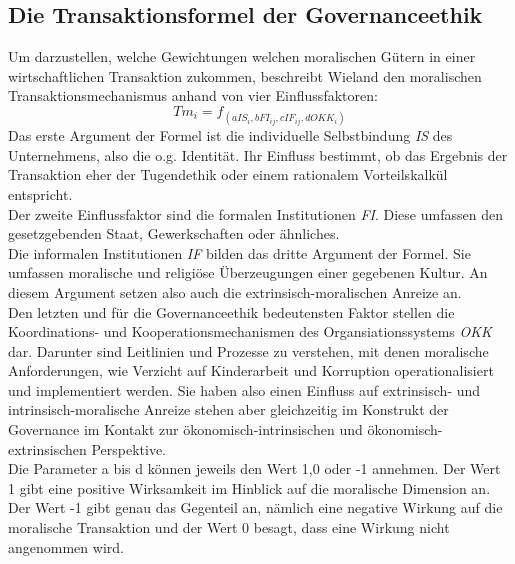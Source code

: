 \documentclass[12pt]{article}
\begin{document}
\subsection{Die Transaktionsformel der Governanceethik}
Um darzustellen, welche Gewichtungen welchen moralischen Gütern in einer wirtschaftlichen Transaktion zukommen, beschreibt Wieland den moralischen Transaktionsmechanismus anhand von vier Einflussfaktoren:
\[Tm_{i}=f_{(aIS_i, bFI_{ij}, cIF_{ij}, dOKK_i)}\]
Das erste Argument der Formel ist die individuelle Selbstbindung \textit{IS} des Unternehmens, also die o.g. Identität. Ihr Einfluss bestimmt, ob das Ergebnis der Transaktion eher der Tugendethik oder einem rationalem Vorteilskalkül entspricht.\\
Der zweite Einflussfaktor sind die formalen Institutionen \textit{FI}. Diese umfassen den gesetzgebenden Staat, Gewerkschaften oder ähnliches.\\
Die informalen Institutionen \textit{IF} bilden das dritte Argument der Formel. Sie umfassen moralische und religiöse Überzeugungen einer gegebenen Kultur. An diesem Argument setzen also auch die extrinsisch-moralischen Anreize an.\\
Den letzten und für die Governanceethik bedeutensten Faktor stellen die Koordinations- und Kooperationsmechanismen des Organsiationssystems \textit{OKK} dar. Darunter sind Leitlinien und Prozesse zu verstehen, mit denen moralische Anforderungen, wie Verzicht auf Kinderarbeit und Korruption operationalisiert und implementiert werden. Sie haben also einen Einfluss auf extrinsisch- und intrinsisch-moralische Anreize stehen aber gleichzeitig im Konstrukt der Governance im Kontakt zur ökonomisch-intrinsischen und ökonomisch-extrinsischen Perspektive.\\
Die Parameter a bis d können jeweils den Wert 1,0 oder -1 annehmen. Der Wert 1 gibt eine positive Wirksamkeit im Hinblick auf die moralische Dimension an. Der Wert -1 gibt genau das Gegenteil an, nämlich eine negative Wirkung auf die moralische Transaktion und der Wert 0 besagt, dass eine Wirkung nicht angenommen wird.
\end{document}
